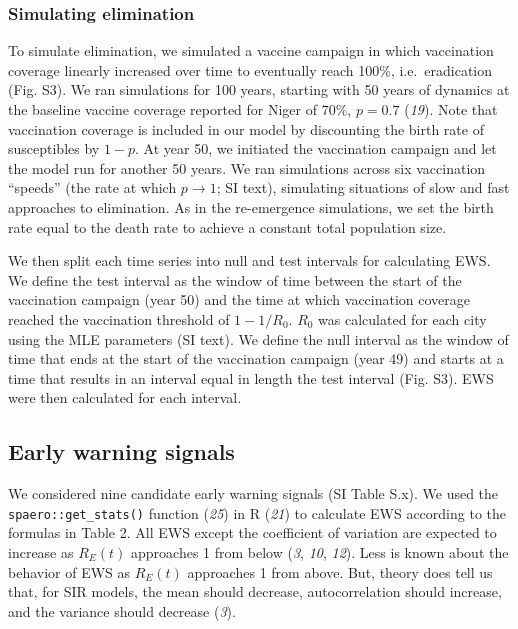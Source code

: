 \documentclass[3p]{elsarticle} %
\begin{document}
\subsubsection{Simulating elimination}\label{simulating-elimination}

To simulate elimination, we simulated a vaccine campaign in which
vaccination coverage linearly increased over time to eventually reach
100\%, i.e.~eradication (Fig. S3). We ran simulations for 100 years,
starting with 50 years of dynamics at the baseline vaccine coverage
reported for Niger of 70\%, \(p = 0.7\) (\emph{19}). Note that
vaccination coverage is included in our model by discounting the birth
rate of susceptibles by \(1-p\). At year 50, we initiated the
vaccination campaign and let the model run for another 50 years. We ran
simulations across six vaccination ``speeds'' (the rate at which
\(p \rightarrow 1\); SI text), simulating situations of slow and fast
approaches to elimination. As in the re-emergence simulations, we set
the birth rate equal to the death rate to achieve a constant total
population size.

We then split each time series into null and test intervals for
calculating EWS. We define the test interval as the window of time
between the start of the vaccination campaign (year 50) and the time at
which vaccination coverage reached the vaccination threshold of
\(1 - 1/R_0\). \(R_0\) was calculated for each city using the MLE
parameters (SI text). We define the null interval as the window of time
that ends at the start of the vaccination campaign (year 49) and starts
at a time that results in an interval equal in length the test interval
(Fig. S3). EWS were then calculated for each interval.

\subsection{Early warning signals}\label{early-warning-signals}

We considered nine candidate early warning signals (SI Table S.x). We
used the \texttt{spaero::get\_stats()} function (\emph{25}) in R
(\emph{21}) to calculate EWS according to the formulas in Table 2. All
EWS except the coefficient of variation are expected to increase as
\(R_E(t)\) approaches 1 from below (\emph{3}, \emph{10}, \emph{12}).
Less is known about the behavior of EWS as \(R_E(t)\) approaches 1 from
above. But, theory does tell us that, for SIR models, the mean should
decrease, autocorrelation should increase, and the variance should
decrease (\emph{3}).
\end{document}
